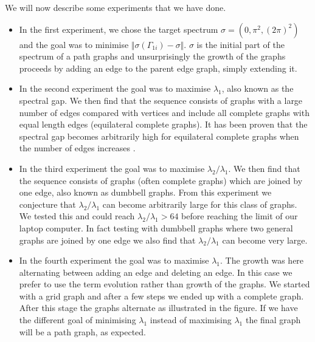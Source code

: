 \documentclass[a4paper]{article}
\begin{document}
We will now describe some experiments that we have done. 
\begin{itemize}
  \item In the first experiment, we chose the target spectrum $\sigma=(0, \pi^2, (2\pi)^2)$ and the goal was to minimise $\Vert \sigma(\Gamma_{1i})-\sigma \Vert$. $\sigma$ is the initial part of the spectrum of a path graphs and unsurprisingly the growth of the graphs proceeds by adding an edge to the parent edge graph, simply extending it.
  \item In the second experiment the goal was to maximise $\lambda_{1}$, also known as the spectral gap. We then find that the sequence consists of graphs with a large number of edges compared with vertices and include all complete graphs with equal length edges (equilateral complete graphs). It has been proven that the spectral gap becomes arbitrarily high for equilateral complete graphs when the number of edges increases \cite{kennedy2015spectral}.
  \item In the third experiment the goal was to maximise $\lambda_{2}/\lambda_{1}$. We then find that the sequence consists of graphs (often complete graphs) which are joined by one edge, also known as dumbbell graphs. From this experiment we conjecture that $\lambda_{2}/\lambda_{1}$ can become arbitrarily large for this class of graphs. We tested this and could reach $\lambda_{2}/\lambda_{1}>64$ before reaching the limit of our laptop computer. In fact testing with dumbbell graphs where two general graphs are joined by one edge we also find that $\lambda_{2}/\lambda_{1}$ can become very large.
  \item In the fourth experiment the goal was to maximise $\lambda_{1}$. The growth was here alternating between adding an edge and deleting an edge. In this case we prefer to use the term evolution rather than growth of the graphs. We started with a grid graph and after a few steps we ended up with a complete graph. After this stage the graphs alternate as illustrated in the figure. If we have the different goal of minimising $\lambda_{1}$ instead of maximising $\lambda_{1}$ the final graph will be a path graph, as expected.
\end{itemize} 
\end{document}
